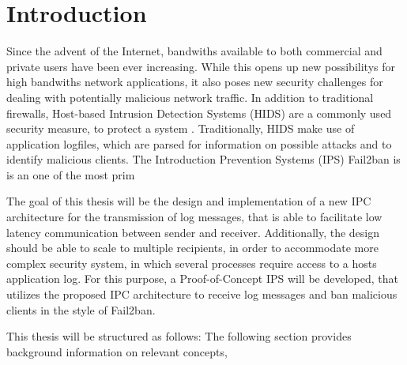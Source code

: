 %
%

\chapter{Introduction}
\label{sec:intro}

Since the advent of the Internet, bandwiths available to both
commercial and private users have been ever increasing. While this opens up new possibilitys for high bandwiths
network applications, it also poses new security challenges for dealing with potentially malicious network traffic. In addition to traditional firewalls, 
Host-based Intrusion Detection Systems (\ac{HIDS}) are a commonly used security measure, to protect a system  . Traditionally, \ac{HIDS} make use of application logfiles, which are parsed
for information on possible attacks and to identify malicious clients. The Introduction Prevention Systems (\ac{IPS}) Fail2ban\cite{fail2ban} is 
is an one of the most prim
\par
The goal of this thesis will be the design and implementation of a new \ac{IPC} architecture for the
transmission of log messages, that is able to facilitate low latency communication
between sender and receiver. Additionally, the design should be able to scale to multiple
recipients, in order to accommodate more complex security system, in which several processes
require access to a hosts application log. For this purpose, a Proof-of-Concept \ac{IPS} will be 
developed, that utilizes the proposed \ac{IPC} architecture to receive log messages and ban malicious
clients in the style of Fail2ban. 


This thesis will be structured as follows: The following section provides background 
information on relevant concepts,  